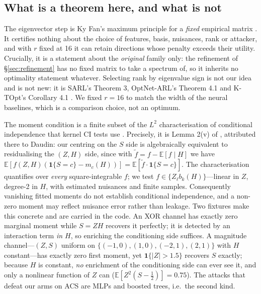 \documentclass[10pt]{article}
\begin{document}
\subsection{What is a theorem here, and what is not}
\label{sec:scope}

The eigenvector step is Ky Fan's maximum principle for a \emph{fixed} empirical matrix
\citep{fan1949weyl}. It certifies nothing about the choice of features, basis, nuisances, rank or
attacker, and with $r$ fixed at 16 it can retain directions whose penalty exceeds their utility.
Crucially, it is a statement about the \emph{original} family only: the refinement of
\S\ref{sec:refinement} has no fixed matrix to take a spectrum of, so it inherits no optimality
statement whatever. Selecting rank by eigenvalue sign is not our idea and is not new: it is SARL's
Theorem 3, OptNet-ARL's Theorem 4.1 and K-TOpt's Corollary 4.1
\citep{sadeghi2019sarl,sadeghi2021optnetarl,sadeghi2022ktopt}. We fixed $r=16$ to match the width
of the neural baselines, which is a comparison choice, not an optimum.

The moment condition is a finite subset of the $L^2$ characterisation of conditional independence
that kernel CI tests use \citep{zhang2011kci,strobl2019rcit}. Precisely, it is Lemma 2(v) of
\citet{zhang2011kci}, attributed there to Daudin: our centring on the $S$ side is algebraically
equivalent to residualising the $(Z,H)$ side, since with $\tilde f=f-\mathbb{E}[f\mid H]$ we have
$\mathbb{E}[f(Z,H)(\mathbf 1\{S=c\}-m_c(H))]=\mathbb{E}[\tilde f\cdot\mathbf 1\{S=c\}]$. The
characterisation quantifies over \emph{every} square-integrable $f$; we test
$f\in\{Z_\ell b_k(H)\}$---linear in $Z$, degree-2 in $H$, with estimated nuisances and finite
samples. Consequently vanishing fitted moments do not establish conditional independence, and a
non-zero moment may reflect nuisance error rather than leakage. Two fixtures make this concrete and
are carried in the code. An XOR channel has exactly zero marginal moment while $S=ZH$ recovers it
perfectly; it is detected by an interaction term \emph{in $H$}, so enriching the conditioning side
suffices. A magnitude channel---$(Z,S)$ uniform on $\{(-1,0),(1,0),(-2,1),(2,1)\}$ with $H$
constant---has exactly zero first moment, yet $\mathbf 1\{|Z|>1.5\}$ recovers $S$ exactly; because
$H$ is constant, \emph{no} enrichment of the conditioning side can ever see it, and only a
nonlinear function of $Z$ can ($\mathbb{E}[Z^2(S-\tfrac12)]=0.75$). The attacks that defeat our
arms on ACS are MLPs and boosted trees, i.e.\ the second kind.
\end{document}
